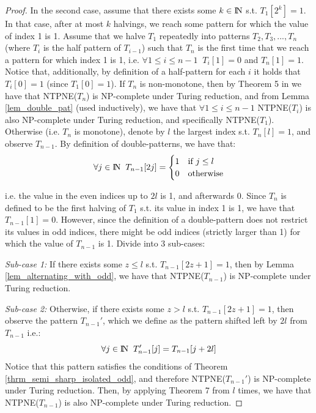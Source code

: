 \documentclass[runningheads]{llncs}
\begin{document}
\begin{proof}
 In the second case, assume that there exists some $k\in {\rm I\!N}$ s.t. $T_1[2^k]=1$. In that case, after at most $k$ halvings, we reach some pattern for which the value of index 1 is 1. Assume that we halve $T_1$ repeatedly into patterns $T_2,T_3,...,T_n$ (where $T_{i}$ is the half pattern of $T_{i-1}$) such that $T_n$ is the first time that we reach a pattern for which index 1 is 1, i.e. $\forall 1\leq i \leq n-1 \;\; T_i[1]=0$ and $T_n[1]=1$. Notice that, additionally, by definition of a half-pattern for each $i$ it holds that $T_i[0]=1$ (since $T_1[0]=1$). If $T_n$ is non-monotone, then by Theorem 5 in \cite{Gilboa_Nisan_public_goods} we have that NTPNE($T_n$) is NP-complete under Turing reduction, and from Lemma \ref{lem_double_pat} (used inductively), we have that $\forall 1\leq i\leq n-1$ NTPNE($T_i$) is also NP-complete under Turing reduction, and specifically NTPNE($T_1$).
 Otherwise (i.e. $T_n$ is monotone), denote by $l$ the largest index s.t. $T_n[l]=1$, and observe $T_{n-1}$. By definition of double-patterns, we have that:
 \begin{align*}
 \forall j\in {\rm I\!N} \;\; T_{n-1}[2j]=
    \begin{cases}
        1 & \text{if $j\leq l$}\\
        0 & \text{otherwise}
    \end{cases}
\end{align*}
 
 i.e. the value in the even indices up to $2l$ is 1, and afterwards 0. Since $T_n$ is defined to be the first halving of $T_1$ s.t. its value in index 1 is 1, we have that $T_{n-1}[1]=0$. However, since the definition of a double-pattern does not restrict its values in odd indices, there might be odd indices (strictly larger than 1) for which the value of $T_{n-1}$ is 1. Divide into 3 sub-cases:

 \textit{Sub-case 1:} If there exists some $z\leq l$ s.t. $T_{n-1}[2z+1]=1$, then by Lemma \ref{lem_alternating_with_odd}, we have that NTPNE($T_{n-1}$) is NP-complete under Turing reduction.
 
 \textit{Sub-case 2:} Otherwise, if there exists some $z>l$ s.t. $T_{n-1}[2z+1]=1$, then observe the pattern $T_{n-1}'$, which we define as the pattern shifted left by $2l$ from $T_{n-1}$ i.e.:
 \[\forall j\in {\rm I\!N} \;\; T_{n-1}'[j]=T_{n-1}[j+2l]\]
 Notice that this pattern satisfies the conditions of Theorem \ref{thrm_semi_sharp_isolated_odd}, and therefore NTPNE($T_{n-1}'$) is NP-complete under Turing reduction. Then, by applying Theorem 7 from \cite{Gilboa_Nisan_public_goods} $l$ times, we have that NTPNE($T_{n-1}$) is also NP-complete under Turing reduction.
 

\end{proof}
\end{document}
